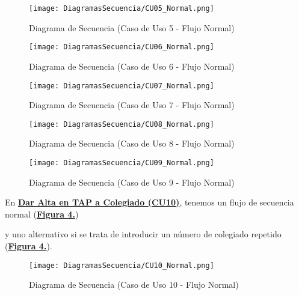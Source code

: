 \begin{figure}[!htbp]
  \centering
  \texttt{[image: DiagramasSecuencia/CU05\_Normal.png]}
  \caption{Diagrama de Secuencia (Caso de Uso 5 - Flujo Normal)}
  \label{fig:Secuencia_CU5_Normal}
\end{figure}
\FloatBarrier

\begin{figure}[!htbp]
  \centering
  \texttt{[image: DiagramasSecuencia/CU06\_Normal.png]}
  \caption{Diagrama de Secuencia (Caso de Uso 6 - Flujo Normal)}
  \label{fig:Secuencia_CU6_Normal}
\end{figure}
\FloatBarrier

\begin{figure}[!htbp]
  \centering
  \texttt{[image: DiagramasSecuencia/CU07\_Normal.png]}
  \caption{Diagrama de Secuencia (Caso de Uso 7 - Flujo Normal)}
  \label{fig:Secuencia_CU7_Normal}
\end{figure}
\FloatBarrier

\begin{figure}[!htbp]
  \centering
  \texttt{[image: DiagramasSecuencia/CU08\_Normal.png]}
  \caption{Diagrama de Secuencia (Caso de Uso 8 - Flujo Normal)}
  \label{fig:Secuencia_CU8_Normal}
\end{figure}
\FloatBarrier

\begin{figure}[!htbp]
  \centering
  \texttt{[image: DiagramasSecuencia/CU09\_Normal.png]}
  \caption{Diagrama de Secuencia (Caso de Uso 9 - Flujo Normal)}
  \label{fig:Secuencia_CU9_Normal}
\end{figure}
\FloatBarrier

\addtocounter{figura_cap4}{1}
En \textbf{\hyperref[tab:curColegAlta]{Dar Alta en TAP a Colegiado (CU10)}}, tenemos un flujo de secuencia normal (\textbf{\hyperref[fig:Secuencia_CU10_Normal]{Figura 4.}}) \addtocounter{figura_cap4}{1} y uno alternativo si se trata de introducir un número de colegiado repetido (\textbf{\hyperref[fig:Secuencia_CU10_Alt1]{Figura 4.}}).
\begin{landscape}
  \begin{figure}[!htbp]
    \centering
    \texttt{[image: DiagramasSecuencia/CU10\_Normal.png]}
    \caption{Diagrama de Secuencia (Caso de Uso 10 - Flujo Normal)}
    \label{fig:Secuencia_CU10_Normal}
  \end{figure}
\end{landscape}
\FloatBarrier

